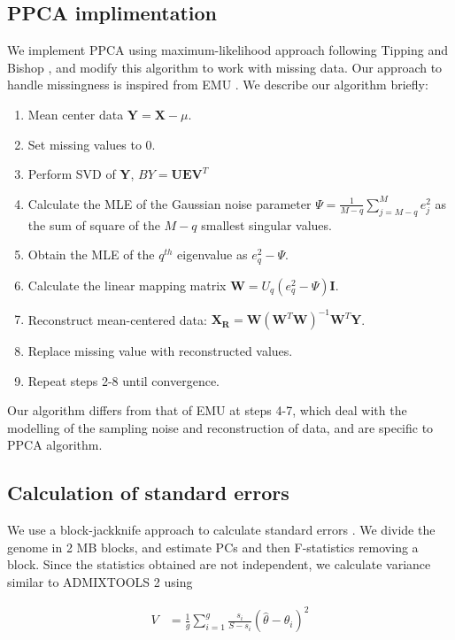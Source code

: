 \documentclass[12pt, letterpaper]{article}
\newcommand{\BY}{\mathbf{Y}}
\newcommand{\BW}{\mathbf{W}}
\newcommand{\BI}{\mathbf{I}}
\newcommand{\MX}{\mathbf{X}}
\begin{document}
\subsection{PPCA implimentation}\label{method-ppca}

We implement PPCA using maximum-likelihood approach following Tipping and                Bishop \cite{tipping_probabilistic_1999-1}, and modify this algorithm to work with missing data. Our approach to handle missingness is inspired from EMU \cite{meisner_large-scale_2021}. We describe our algorithm briefly:
\begin{enumerate}
    \item Mean center data $\BY = \MX - \mu$.
    \item Set missing values to 0.
    \item Perform SVD of $\BY$, $BY = \mathbf{UEV}^T$
    \item Calculate the MLE of the Gaussian noise parameter $\Psi = \frac{1}{M-q} \sum_{j=M-q}^ M e_j^2$ as the sum of square of the $M-q$ smallest singular values.
    \item Obtain the MLE of the $q^{th}$ eigenvalue as $e_q^2 - \Psi$.
    \item Calculate the linear mapping matrix $\BW = U_q (e_q^2 - \Psi)\BI$.
    \item Reconstruct mean-centered data: $\mathbf{X_R} = \BW(\BW^T\BW)^{-1}\BW^T\BY$.
    \item Replace missing value with reconstructed values.
    \item Repeat steps 2-8 until convergence.
\end{enumerate}

Our algorithm differs from that of EMU at steps 4-7, which deal with the modelling of the sampling noise and reconstruction of data, and are specific to PPCA algorithm.

\subsection{Calculation of standard errors}

We use a block-jackknife approach to calculate standard errors \cite{maier_limits_2022}. We divide the genome in 2 MB blocks, and estimate PCs and then F-statistics removing a block. Since the statistics obtained are not independent, we calculate variance similar to ADMIXTOOLS 2 using 

\begin{align}\label{eq:bjk_var}
V &= \frac{1}{g} \sum_{i=1}^g \frac{s_i}{S-s_i} (\hat{\theta} - \theta_i)^2
\end{align}
\end{document}
